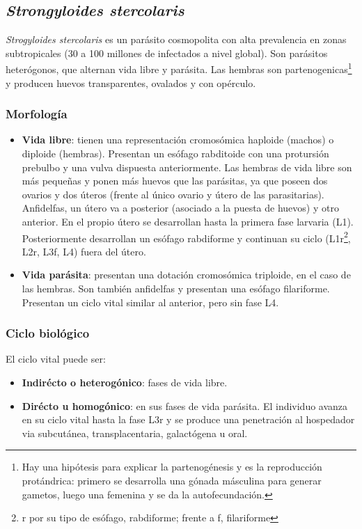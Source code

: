 \subsection{\textit{Strongyloides stercolaris}}
\textit{Strogyloides stercolaris} es un parásito cosmopolita con alta prevalencia en zonas subtropicales (30 a 100 millones de infectados a nivel global). Son parásitos heterógonos, que alternan vida libre y parásita. Las hembras son partenogenicas\footnote{Hay una hipótesis para explicar la partenogénesis y es la reproducción protándrica: primero se desarrolla una gónada másculina para generar gametos, luego una femenina y se da la autofecundación.} y producen huevos transparentes, ovalados y con opérculo.
\subsubsection{Morfología}
\begin{itemize}[itemsep=0pt,parsep=0pt,topsep=0pt,partopsep=0pt]
	\item \textbf{Vida libre}: tienen una representación cromosómica haploide (machos) o diploide (hembras). Presentan un esófago rabditoide con una protursión prebulbo y una vulva dispuesta anteriormente. Las hembras de vida libre son más pequeñas y ponen más huevos que las parásitas, ya que poseen dos ovarios y dos úteros (frente al único ovario y útero de las parasitarias). Anfidelfas, un útero va a posterior (asociado a la puesta de huevos) y otro anterior. En el propio útero se desarrollan hasta la primera fase larvaria (L1). Posteriormente desarrollan un esófago rabdiforme y continuan su ciclo (L1r\footnote{r por su tipo de esófago, rabdiforme; frente a f, filariforme}, L2r, L3f, L4) fuera del útero.
	\item \textbf{Vida parásita}: presentan una dotación cromosómica triploide, en el caso de las hembras. Son también anfidelfas y presentan una esófago filariforme. Presentan un ciclo vital similar al anterior, pero sin fase L4.
\end{itemize}
\subsubsection{Ciclo biológico}
El ciclo vital puede ser:
\begin{itemize}[itemsep=0pt,parsep=0pt,topsep=0pt,partopsep=0pt]
	\item \textbf{Indirécto o heterogónico}: fases de vida libre.
	\item \textbf{Dirécto u homogónico}: en sus fases de vida parásita. El individuo avanza en su ciclo vital hasta la fase L3r y se produce una penetración al hospedador via subcutánea, transplacentaria, galactógena u oral.
\end{itemize}

